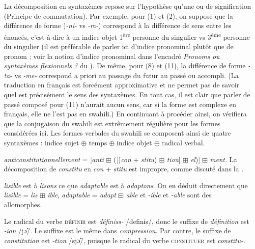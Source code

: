 {     La décomposition en syntaxèmes repose sur l’hypothèse qu’une  ou de signification (Principe de commutation). Par exemple, pour (1) et (2), on suppose que la différence de forme (\textit{{}-ni-} vs \textit{{}-m-}) correspond à la différence de sens entre les énoncés, c’est-à-dire à un indice objet 1\textsuperscript{ère} personne du singulier vs 3\textsuperscript{ème} personne du singulier (il est préférable de parler ici d’indice pronominal plutôt que de pronom ; voir la notion d’indice pronominal dans l’encadré \textit{Pronoms ou syntaxèmes flexionnels ?} du ). De même, pour (8) et (11), la différence de forme \textit{{}-ta-} vs \textit{{}-me-} correspond a priori au passage du futur au passé ou accompli. (La traduction en français est forcément approximative et ne permet pas de savoir quel est précisément le sens des syntaxèmes. En tout cas, il est clair que parler de passé composé pour (11) n’aurait aucun sens, car si la forme est complexe en français, elle ne l’est pas en swahili.) En continuant à procéder ainsi, on vérifiera que la conjugaison du swahili est extrêmement régulière pour les formes considérées ici. Les formes verbales du swahili se composent ainsi de quatre syntaxèmes : indice sujet \textrm{${\oplus}$} temps \textrm{${\oplus}$} indice objet \textrm{${\oplus}$} radical verbal.

     \textit{anticonstitutionnellement} = [\textit{anti} \textrm{${\boxplus}$} ([(\textit{con} + \textit{stitu}) \textrm{${\boxplus}$} \textit{tion}] \textrm{${\boxplus}$} \textit{el})] \textrm{${\boxplus}$} \textit{ment.} La décomposition de \textit{constitu} en \textit{con} + \textit{stitu} est impropre, comme discuté dans la .

     \textit{lisible} est à \textit{lisons} ce que \textit{adaptable} est à \textit{adaptons}. On en déduit directement que \textit{lisible} = \textit{lis} \textrm{${\boxplus}$} \textit{ible}, \textit{adaptable} = \textit{adapt} \textrm{${\boxplus}$} \textit{able} et \textit{{}-ible} et \textit{{}-able} sont des allomorphes.

     Le radical du verbe \textsc{définir} est \textit{définiss-} /definis/, donc le suffixe de \textit{définition} est \textit{{}-ion} /j\~{ɔ}/. Le suffixe est le même dans \textit{compression}. Par contre, le suffixe de \textit{constitution} est \textit{{}-tion} /sj\~{ɔ}/, puisque le radical du verbe \textsc{constituer} est \textit{constitu-}.

}
